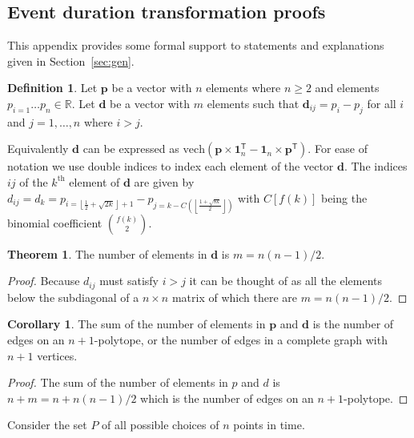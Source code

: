 \documentclass[12pt,oneside,a4paper]{article} %
\theoremstyle{definition}
\newtheorem{definition}{Definition}[section]
\newtheorem{theorem}{Theorem}[section]
\newtheorem{corollary}{Corollary}[theorem]
\begin{document}
\begin{appendices}
\section{Event duration transformation proofs}
\label{app:A}
This appendix provides some formal support to statements and explanations given
in Section~\ref{sec:gen}.

\begin{definition} Let $\textbf{p}$ be a vector with $n$ elements where $n \geq
2$ and elements $p_{i=1} \ldots p_n \in \mathbb{R}$. Let $\textbf{d}$ be a vector with $m$ elements such that $\textbf{d}_{ij} = p_i - p_j$ for all $i$ and $j = 1, \ldots, n$ where $i>j$.
\end{definition}

Equivalently $\textbf{d}$ can be expressed as $\text{vech}(\textbf{p}\times
\textbf{1}_n^\textsf{T} - \textbf{1}_n \times \textbf{p}^\textsf{T})$. For ease
of notation we use double indices to index each element of the vector
$\textbf{d}$. The indices $ij$ of the $k^\text{th}$ element of $\textbf{d}$ are
given by $d_{ij} = d_k = p_{i=\left\lfloor \frac
{1}{2}+\sqrt{2k}\right\rfloor+1} - p_{j=k-C\left(\left\lfloor
\frac{1+\sqrt{8k}}{2}\right\rfloor\right)}$ with $C[f(k)]$ being the binomial
coefficient $\binom{f(k)}{2}$.

\begin{theorem} 
The number of elements in $\textbf{d}$ is $m = n(n-1)/2$.
\end{theorem}

\begin{proof} 
Because $d_{ij}$ must satisfy $i > j$ it can be thought of as all
the elements below the subdiagonal of a $n\times n$ matrix of which there are $m = n(n-1)/2$.
\end{proof}

\begin{corollary} 
The sum of the number of elements in $\textbf{p}$ and
$\textbf{d}$ is the number of edges on an $n+1$-polytope, or the number of edges
in a complete graph with $n+1$ vertices.
\end{corollary}

\begin{proof} 
The sum of the number of elements in $p$ and $d$ is $n+m = n + n(n-1)/2$ which
is the number of edges on an $n+1$-polytope.
\end{proof}

Consider the set $P$ of all possible choices of $n$ points in time.


\end{appendices}
\end{document}
